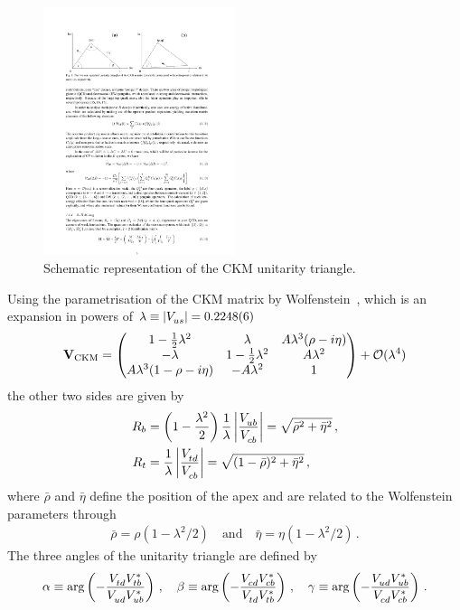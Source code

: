 \begin{figure}[htb]
\centering
\includegraphics[width=0.5\textwidth]{03-CPViolation/figs/CKMtriangle_prelim.pdf}
\caption{Schematic representation of the CKM unitarity triangle.}
\label{fig:cpviolation:ckmtriangle}
\end{figure}
Using the parametrisation of the CKM matrix by
Wolfenstein~\cite{Wolfenstein:1983yz}, which is an expansion in powers of
$\lambda \equiv |\Vus| = \num{0.2248\pm0.0006}$~\cite{PDG2016}
\begin{align}
\matr{V}_{\text{CKM}} =
\begin{pmatrix}
1 - \frac 12 \lambda^2 & \lambda & A\lambda^3(\rho - i\eta) \\
- \lambda & 1 - \frac 12 \lambda^2 & A\lambda^2 \\
A\lambda^3(1 - \rho - i\eta) & -A\lambda^2 & 1
\end{pmatrix}
+ \mathcal{O}(\lambda^4)
\end{align}
the other two sides are given by
\begin{align}
	R_b &= \left(1 - \frac{\lambda^2}2\right)\frac 1\lambda \left|\frac \Vub\Vcb\right| = \sqrt{\bar{\rho}^2 + \bar{\eta}^2}\,,\label{eq:cpviolation:Rb}\\
	R_t &= \frac 1\lambda \left|\frac \Vtd\Vcb\right| = \sqrt{(1 - \bar{\rho})^2 + \bar{\eta}^2}\,,
\end{align}
where $\bar{\rho}$ and $\bar{\eta}$ define the position of the apex and are
related to the Wolfenstein parameters through
\begin{align}
	\bar{\rho} = \rho(1 - \lambda^2/2)\quad \text{and} \quad \bar{\eta} = \eta(1 - \lambda^2/2)\,.
\end{align}
The three angles of the unitarity triangle are defined by
\begin{align}
	\alpha \equiv \text{arg}\left(-\frac{\Vtd\Vtbs}{\Vud\Vubs}\right)\,,\quad
	\beta \equiv \text{arg}\left(-\frac{\Vcd\Vcbs}{\Vtd\Vtbs}\right)\,,\quad
	\gamma \equiv \text{arg}\left(-\frac{\Vud\Vubs}{\Vcd\Vcbs}\right)\,.
\label{eq:cpviolation:angles}
\end{align}

